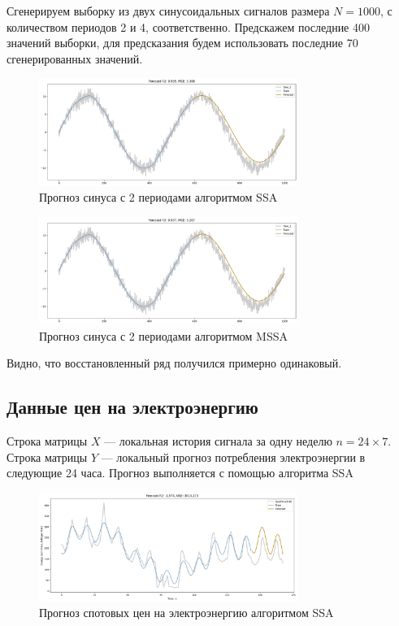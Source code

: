 \documentclass{article}
\begin{document}
Сгенерируем выборку из двух синусоидальных сигналов размера $N = 1000$, с количеством периодов 2 и 4, соответственно. Предскажем последние 400 значений выборки, для предсказания будем использовать последние 70 сгенерированных значений.\\
\begin{figure}[H]
	\centering
	\includegraphics[width=0.75\textwidth]{figures/sin2_ssa.png}
	\caption{Прогноз синуса с 2 периодами алгоритмом SSA}
	\label{fig:fig1}
\end{figure}
\begin{figure}[H]
	\centering
	\includegraphics[width=0.75\textwidth]{figures/sin2_mssa.png}
	\caption{Прогноз синуса с 2 периодами алгоритмом MSSA}
	\label{fig:fig2}
\end{figure}

Видно, что восстановленный ряд получился примерно одинаковый.

\subsection{Данные цен на электроэнергию}

Строка матрицы $X$ –– локальная история сигнала за одну неделю $n = 24 \times 7$. Строка матрицы
$Y$ — локальный прогноз потребления электроэнергии в следующие 24 часа. Прогноз выполняется с помощью алгоритма SSA
\begin{figure}[H]
	\centering
	\includegraphics[width=0.75\textwidth]{figures/electricity_prediction.png}
	\caption{Прогноз спотовых цен на электроэнергию алгоритмом SSA}
	\label{fig:fig3}
\end{figure}
\end{document}
